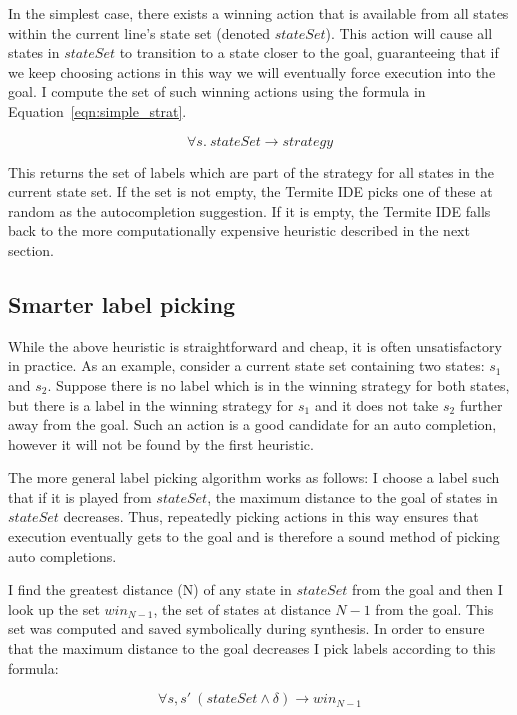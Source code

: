 In the simplest case, there exists a winning action that is available from all states within the current line's state set (denoted $stateSet$). This action will cause all states in $stateSet$ to transition to a state closer to the goal, guaranteeing that if we keep choosing actions in this way we will eventually force execution into the goal. I compute the set of such winning actions using the formula in Equation~\ref{eqn:simple_strat}. 

\begin{equation}
\forall s. \: stateSet \rightarrow strategy
\label{eqn:simple_strat}
\end{equation}

This returns the set of labels which are part of the strategy for all states in the current state set. If the set is not empty, the Termite IDE picks one of these at random as the autocompletion suggestion. If it is empty, the Termite IDE falls back to the more computationally expensive heuristic described in the next section.

\subsection{Smarter label picking}

While the above heuristic is straightforward and cheap, it is often unsatisfactory in practice. As an example, consider a current state set containing two states: $s_1$ and $s_2$. Suppose there is no label which is in the winning strategy for both states, but there is a label in the winning strategy for $s_1$ and it does not take $s_2$ further away from the goal. Such an action is a good candidate for an auto completion, however it will not be found by the first heuristic.

The more general label picking algorithm works as follows: I choose a label such that if it is played from $stateSet$, the maximum distance to the goal of states in $stateSet$ decreases. Thus, repeatedly picking actions in this way ensures that execution eventually gets to the goal and is therefore a sound method of picking auto completions. 

I find the greatest distance (N) of any state in $stateSet$ from the goal and then I look up the set $win_{N-1}$, the set of states at distance $N-1$ from the goal. This set was computed and saved symbolically during synthesis. In order to ensure that the maximum distance to the goal decreases I pick labels according to this formula:

\begin{equation}
    \forall s, s' \: (stateSet \land \delta) \rightarrow win_{N-1}
\end{equation}


